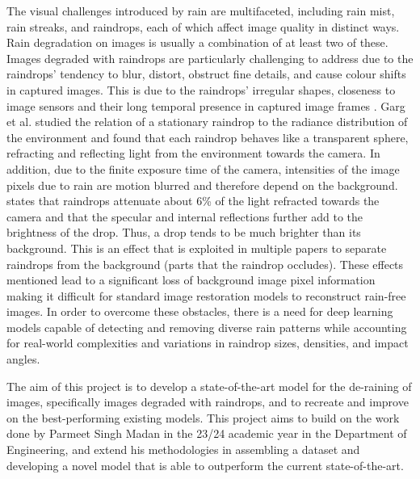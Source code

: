 \documentclass[11pt]{ociamthesis}  %
\begin{document}
The visual challenges introduced by rain are multifaceted, including rain mist, rain streaks, and raindrops, each of which affect image quality in distinct ways. Rain degradation on images is usually a combination of at least two of these. Images degraded with raindrops are particularly challenging to address due to the raindrops' tendency to blur, distort, obstruct fine details, and cause colour shifts in captured images. This is due to the raindrops' irregular shapes, closeness to image sensors and their long temporal presence in captured image frames \cite{hamzeh2021review}. Garg et al. \cite{1315077} studied the relation of a stationary raindrop to the radiance distribution of the environment and found that each raindrop behaves like a transparent sphere, refracting and reflecting light from the environment towards the camera. In addition, due to the finite exposure time of the camera, intensities of the image pixels due to rain are motion blurred and therefore depend on the background. \cite{1315077} states that raindrops attenuate about 6\% of the light refracted towards the camera and that the specular and internal reflections further add to the brightness of the drop. Thus, a drop tends to be much brighter than its background. This is an effect that is exploited in multiple papers to separate raindrops from the background (parts that the raindrop occludes). These effects mentioned lead to a significant loss of background image pixel information making it difficult for standard image restoration models to reconstruct rain-free images. In order to overcome these obstacles, there is a need for deep learning models capable of detecting and removing diverse rain patterns while accounting for real-world complexities and variations in raindrop sizes, densities, and impact angles.

The aim of this project is to develop a state-of-the-art model for the de-raining of images, specifically images degraded with raindrops, and to recreate and improve on the best-performing existing models. This project aims to build on the work done by Parmeet Singh Madan\cite{Parmeet_Report} in the 23/24  academic year in the Department of Engineering, and extend his methodologies in assembling a dataset and developing a novel model that is able to outperform the current state-of-the-art.
\end{document}
